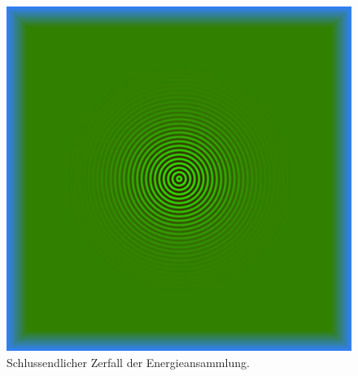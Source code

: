 \begin{figure}
    \includegraphics{papers/particles/figures/wavesim/particle_initial_state.png}
    \caption{Schlussendlicher Zerfall der Energieansammlung.\ }\label{particles:fig:partikel:abnehmen:zerfall}
\end{figure}
